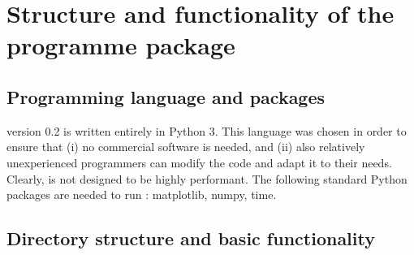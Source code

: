 \chapter{Structure and functionality of the programme package}

\section{Programming language and packages}

\GI version 0.2 is written entirely in Python 3. This language was chosen in order to ensure that (i) no commercial software is needed, and (ii) also relatively unexperienced programmers can modify the code and adapt it to their needs. Clearly, \GI is not designed to be highly performant. The following standard Python packages are needed to run \GI: matplotlib, numpy, time.


\section{Directory structure and basic functionality}

